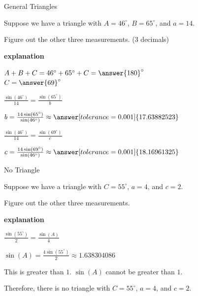 \documentclass{ximera}
\begin{document}
\begin{example}  General Triangles 


Suppose we have a triangle with $A=46^{\circ}$, $B=65^{\circ}$, and $a=14$.

Figure out the other three measurements. (3 decimals)


\textbf{\textcolor{red!75!green}{explanation}} 

$A + B + C = 46^{\circ} + 65^{\circ} + C = \answer{180}^{\circ}$ \\

$C = \answer{69}^{\circ}$


$\frac{\sin(46^{\circ})}{14} = \frac{\sin(65^{\circ})}{b}$

$b = \frac{14 \sin(65^{\circ})}{\sin(46^{\circ})} \approx \answer[tolerance=0.001]{17.63882523}$

$\frac{\sin(46^{\circ})}{14} = \frac{\sin(69^{\circ})}{c}$

$c = \frac{14 \sin(69^{\circ})}{\sin(46^{\circ})} \approx \answer[tolerance=0.001]{18.16961325}$





\end{example}












\begin{example}  No Triangle 


Suppose we have a triangle with $C=55^{\circ}$, $a=4$, and $c=2$.

Figure out the other three measurements.


\textbf{\textcolor{red!75!green}{explanation}} 


$\frac{\sin(55^{\circ})}{2} = \frac{\sin(A)}{4}$

$\sin(A) = \frac{4 \sin(55^{\circ})}{2} \approx 1.638304086$

This is greater than $1$. $\sin(A)$ cannot be greater than $1$.

Therefore, there is no triangle with $C=55^{\circ}$, $a=4$, and $c=2$. 





\end{example}
\end{document}
